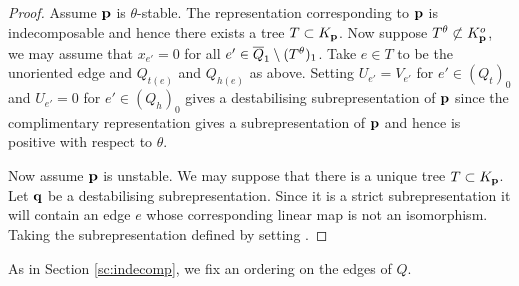 \documentclass{amsart}
\theoremstyle{definition}
\begin{document}
\begin{proof}
Assume $\mathbf{p}$ is $\theta$-stable.
The representation corresponding to $\mathbf{p}$ is indecomposable and hence there exists a tree $T \subset K_{\mathbf{p}}$.
Now suppose $T^\theta \not\subset K_{\mathbf{p}}^o$, we may assume that $x_{e'}=0$ for all $e' \in {\overline{Q}}_1 \setminus (T^\theta)_1$. 
Take $e \in T$ to be the unoriented edge and $Q_{t(e)}$ and $Q_{h(e)}$ as above.
Setting $U_{e'} = V_{e'}$ for $e' \in (Q_t)_0$ and $U_{e'}=0$ for $e' \in (Q_h)_0$ gives a destabilising subrepresentation of $\mathbf{p}$ since the complimentary representation gives a subrepresentation of $\mathbf{p}$ and hence is positive with respect to $\theta$.

Now assume $\mathbf{p}$ is unstable.
We may suppose that there is a unique tree $T \subset K_{\mathbf{p}}$.
Let $\mathbf{q}$ be a destabilising subrepresentation.
Since it is a strict subrepresentation it will contain an edge $e$ whose corresponding linear map is not an isomorphism.
Taking the subrepresentation defined by setting .
\end{proof}

As in Section \ref{sc:indecomp}, we fix an ordering on the edges of $Q$.
\end{document}

